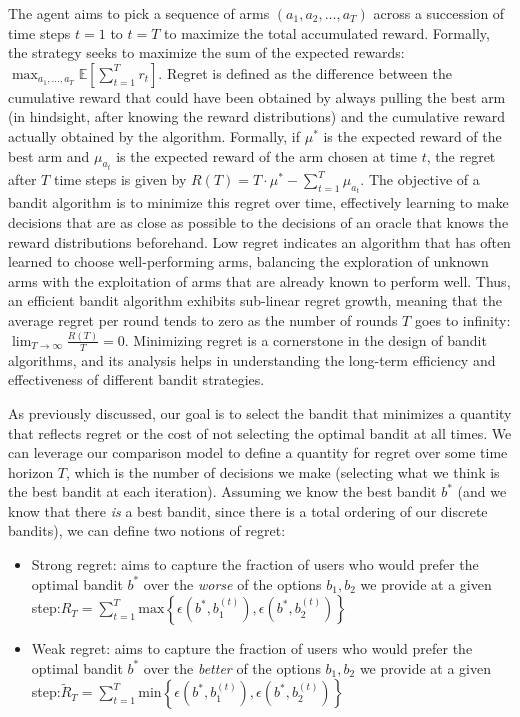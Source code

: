 \documentclass[
  letterpaper,
  numbers=noenddot,
  DIV=11]{scrreprt}
\theoremstyle{definition}
\theoremstyle{plain}
\theoremstyle{plain}
\theoremstyle{remark}
\begin{document}
The agent aims to pick a sequence of arms \((a_1, a_2, \ldots, a_T)\)
across a succession of time steps \(t = 1\) to \(t = T\) to maximize the
total accumulated reward. Formally, the strategy seeks to maximize the
sum of the expected rewards:
\(\max_{a_1, \ldots, a_T} \mathbb{E} \left[\sum_{t=1}^{T} r_t\right]\).
Regret is defined as the difference between the cumulative reward that
could have been obtained by always pulling the best arm (in hindsight,
after knowing the reward distributions) and the cumulative reward
actually obtained by the algorithm. Formally, if \(\mu^*\) is the
expected reward of the best arm and \(\mu_{a_t}\) is the expected reward
of the arm chosen at time \(t\), the regret after \(T\) time steps is
given by \(R(T) = T \cdot \mu^* - \sum_{t=1}^{T} \mu_{a_t}\). The
objective of a bandit algorithm is to minimize this regret over time,
effectively learning to make decisions that are as close as possible to
the decisions of an oracle that knows the reward distributions
beforehand. Low regret indicates an algorithm that has often learned to
choose well-performing arms, balancing the exploration of unknown arms
with the exploitation of arms that are already known to perform well.
Thus, an efficient bandit algorithm exhibits sub-linear regret growth,
meaning that the average regret per round tends to zero as the number of
rounds \(T\) goes to infinity:
\(\lim_{T \to \infty} \frac{R(T)}{T} = 0\). Minimizing regret is a
cornerstone in the design of bandit algorithms, and its analysis helps
in understanding the long-term efficiency and effectiveness of different
bandit strategies.

As previously discussed, our goal is to select the bandit that minimizes
a quantity that reflects regret or the cost of not selecting the optimal
bandit at all times. We can leverage our comparison model to define a
quantity for regret over some time horizon \(T\), which is the number of
decisions we make (selecting what we think is the best bandit at each
iteration). Assuming we know the best bandit \(b^*\) (and we know that
there \emph{is} a best bandit, since there is a total ordering of our
discrete bandits), we can define two notions of regret:

\begin{itemize}
\item
  Strong regret: aims to capture the fraction of users who would prefer
  the optimal bandit \(b^*\) over the \emph{worse} of the options
  \(b_1, b_2\) we provide at a given
  step:\(R_T = \sum_{t = 1}^T \text{max} \left\{ \epsilon(b^*, b_1^{(t)}), \epsilon(b^*, b_2^{(t)}) \right\}\)
\item
  Weak regret: aims to capture the fraction of users who would prefer
  the optimal bandit \(b^*\) over the \emph{better} of the options
  \(b_1, b_2\) we provide at a given
  step:\(\tilde{R}_T = \sum_{t = 1}^T \text{min} \left\{ \epsilon(b^*, b_1^{(t)}), \epsilon(b^*, b_2^{(t)}) \right\}\)
\end{itemize}
\end{document}

